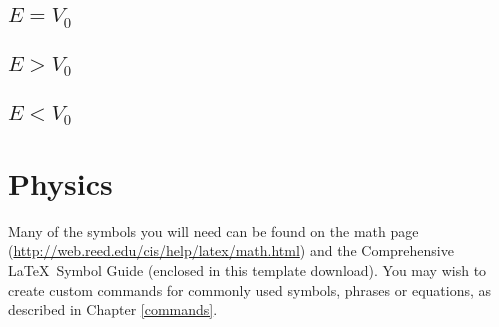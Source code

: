     \subsection{$E = V_0$}
    \subsection{$E > V_0$}
    \subsection{$E < V_0$}
    
    
    
    
\section{Physics}

Many of the symbols you will need can be found on the math page (\url{http://web.reed.edu/cis/help/latex/math.html}) and the Comprehensive \LaTeX\ Symbol Guide (enclosed in this template download).  You may wish to create custom commands for commonly used symbols, phrases or equations, as described in Chapter \ref{commands}.
